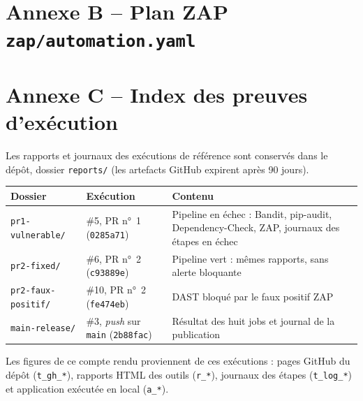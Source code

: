 \documentclass[11pt,a4paper]{article}
\newcommand{\code}[1]{\texttt{#1}}
\begin{document}
\section*{Annexe B -- Plan ZAP \texttt{zap/automation.yaml}}\label{sec:zapplan}


\section*{Annexe C -- Index des preuves d'exécution}
Les rapports et journaux des exécutions de référence sont conservés dans le dépôt, dossier
\code{reports/} (les artefacts GitHub expirent après 90 jours).

\begin{table}[H]
\centering
\small
\begin{tabularx}{\textwidth}{@{}llL@{}}
\toprule
\textbf{Dossier} & \textbf{Exécution} & \textbf{Contenu} \\
\midrule
\code{pr1-vulnerable/} & \#5, PR n°~1 (\code{0285a71}) & Pipeline en échec : Bandit, pip-audit, Dependency-Check, ZAP, journaux des étapes en échec \\
\code{pr2-fixed/} & \#6, PR n°~2 (\code{c93889e}) & Pipeline vert : mêmes rapports, sans alerte bloquante \\
\code{pr2-faux-positif/} & \#10, PR n°~2 (\code{fe474eb}) & DAST bloqué par le faux positif ZAP \\
\code{main-release/} & \#3, \emph{push} sur \code{main} (\code{2b88fac}) & Résultat des huit jobs et journal de la publication \\
\bottomrule
\end{tabularx}
\end{table}

\noindent Les figures de ce compte rendu proviennent de ces exécutions : pages GitHub du dépôt (\code{t\_gh\_*}),
rapports HTML des outils (\code{r\_*}), journaux des étapes (\code{t\_log\_*}) et application exécutée en
local (\code{a\_*}).
\end{document}
